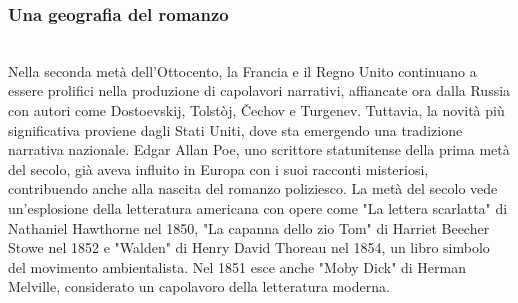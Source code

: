 \documentclass{report}
\begin{document}
\subsubsection{Una geografia del romanzo}
\\
Nella seconda metà dell'Ottocento, la Francia e il Regno Unito continuano a essere prolifici nella produzione di capolavori narrativi, affiancate ora dalla Russia con autori come Dostoevskij, Tolstòj, Čechov e Turgenev. Tuttavia, la novità più significativa proviene dagli Stati Uniti, dove sta emergendo una tradizione narrativa nazionale. Edgar Allan Poe, uno scrittore statunitense della prima metà del secolo, già aveva influito in Europa con i suoi racconti misteriosi, contribuendo anche alla nascita del romanzo poliziesco. La metà del secolo vede un'esplosione della letteratura americana con opere come "La lettera scarlatta" di Nathaniel Hawthorne nel 1850, "La capanna dello zio Tom" di Harriet Beecher Stowe nel 1852 e "Walden" di Henry David Thoreau nel 1854, un libro simbolo del movimento ambientalista. Nel 1851 esce anche "Moby Dick" di Herman Melville, considerato un capolavoro della letteratura moderna.
\\
\\
\\
\end{document}

